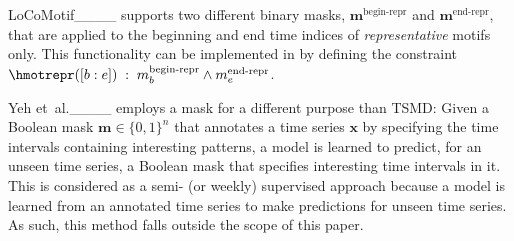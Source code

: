 %
%
LoCoMotif____ supports two different binary masks, $\mathbf{m}^{\text{begin-repr}}$ and $\mathbf{m}^{\text{end-repr}}$, that are applied to the beginning and end time indices of \emph{representative} motifs only. 
%
This functionality can be implemented in \locomotifdok by defining the constraint
${\hmotrepr([b:e]) \;:\; m^{\text{begin-repr}}_b \land m^{\text{end-repr}}_e}$.
%
%
%
%
%
%
%

Yeh et~al.____ employs a mask for a different purpose than TSMD: 
%
Given a Boolean mask $\mathbf{m} \in \{ 0,1 \} ^n $ that annotates a time series $\mathbf{x}$ by specifying the time intervals containing interesting patterns, 
%
a model is learned to 
predict, for an unseen time series, a Boolean mask that specifies interesting time intervals in it.
%
%
This is considered as a semi- (or weekly) supervised approach 
%
because a model is learned from an annotated time series to make predictions for unseen time series.
%
As such, this method falls outside the scope of this paper.

%
%
%
%
%

%

%
%
%
%
%
%
%
%
%

%
%
%
%

%

%
%
%

%
%
%
%
%
%
%
%
%
%

%
%
%
%

%
%
%
%
%
%
%
%
%

%
%
%
%
%
%
%
%

%
%

%

%
%

%

%



%

%
%
%
%

%
%
%
%
%
%

%
%
%

%
%

%
%
%
%

%

%
%
%
%
%
%
%
%
%
%
%
%
%
%

%
%
%
%
%

%
%
%

%

%
%